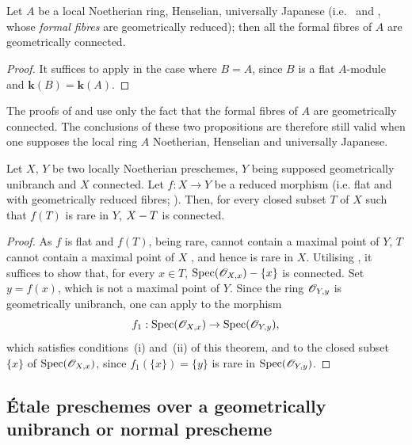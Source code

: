 \begin{corollary}[18.9.9]
\label{IV.18.9.9}
Let $A$ be a local Noetherian ring, Henselian, universally Japanese \textup{(i.e.~ and , whose \emph{formal fibres}  are geometrically reduced)};
then all the formal fibres of $A$ are geometrically connected.
\end{corollary}

\begin{proof}
It suffices to apply  in the case where $B=\hat{A}$, since $B$ is a flat $A$-module and $\boldsymbol{k}(B)=\boldsymbol{k}(A)$.
\end{proof}

\begin{remark}[18.9.10]
\label{IV.18.9.10}
The proofs of  and  use only the fact that the formal fibres of $A$ are geometrically connected.
The conclusions
of these two propositions are therefore still valid when one supposes the local ring $A$ Noetherian, Henselian and universally Japanese.
\end{remark}

\begin{corollary}[18.9.11]
\label{IV.18.9.11}
Let $X$, $Y$ be two locally Noetherian preschemes, $Y$ being supposed geometrically unibranch and $X$ connected.
Let $f:X\to Y$ be a reduced morphism \textup{(i.e. flat and with geometrically reduced fibres; )}.
Then, for every closed subset $T$ of $X$ such that $f(T)$ is rare in $Y$, $X- T$ is connected.
\end{corollary}

\begin{proof}
As $f$ is flat and $f(T)$, being rare, cannot contain a maximal point of $Y$, $T$ cannot contain a maximal point of $X$ , and hence is rare in $X$.
Utilising , it suffices to show that, for every $x\in T$, $\operatorname{Spec}(\mathscr{O}_{X,x})-\{x\}$ is connected.
Set $y=f(x)$, which is not a maximal point of $Y$.
Since the ring $\mathscr{O}_{Y,y}$ is geometrically unibranch, one can apply  to the morphism
\[
  f_1:\operatorname{Spec}(\mathscr{O}_{X,x})\to\operatorname{Spec}(\mathscr{O}_{Y,y}),
\]
which satisfies conditions~(i) and~(ii) of this theorem, and to the closed subset $\{x\}$ of $\operatorname{Spec}(\mathscr{O}_{X,x})$, since $f_1(\{x\})=\{y\}$ is rare in $\operatorname{Spec}(\mathscr{O}_{Y,y})$.
\end{proof}
\subsection{\'Etale preschemes over a geometrically unibranch or normal prescheme}
\label{subsection:IV.18.10}

